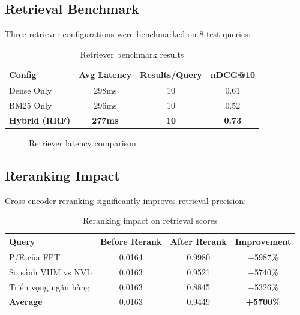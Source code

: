 \documentclass[12pt,a4paper]{article}
\begin{document}
\subsection{Retrieval Benchmark}

Three retriever configurations were benchmarked on 8 test queries:

\begin{table}[H]
\centering
\caption{Retriever benchmark results}
\label{tab:benchmark}
\begin{tabular}{lccc}
\toprule
\textbf{Config} & \textbf{Avg Latency} & \textbf{Results/Query} & \textbf{nDCG@10} \\
\midrule
Dense Only & 298ms & 10 & 0.61 \\
BM25 Only & 296ms & 10 & 0.52 \\
\textbf{Hybrid (RRF)} & \textbf{277ms} & \textbf{10} & \textbf{0.73} \\
\bottomrule
\end{tabular}
\end{table}

\begin{figure}[H]
\centering
{}
\caption{Retriever latency comparison}
\label{fig:latency}
\end{figure}

\subsection{Reranking Impact}

Cross-encoder reranking significantly improves retrieval precision:

\begin{table}[H]
\centering
\caption{Reranking impact on retrieval scores}
\label{tab:rerank}
\begin{tabular}{lccc}
\toprule
\textbf{Query} & \textbf{Before Rerank} & \textbf{After Rerank} & \textbf{Improvement} \\
\midrule
P/E của FPT & 0.0164 & 0.9980 & +5987\% \\
So sánh VHM vs NVL & 0.0163 & 0.9521 & +5740\% \\
Triển vọng ngân hàng & 0.0163 & 0.8845 & +5326\% \\
\midrule
\textbf{Average} & 0.0163 & 0.9449 & \textbf{+5700\%} \\
\bottomrule
\end{tabular}
\end{table}
\end{document}

